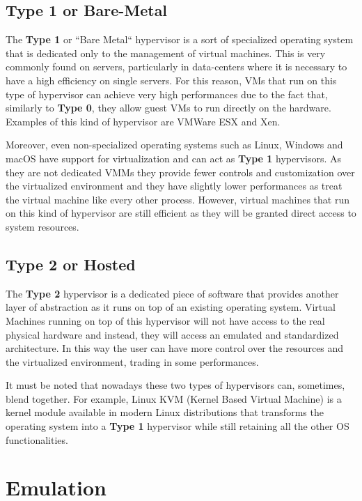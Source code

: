 \subsection{Type 1 or Bare-Metal}

The \textbf{Type 1} or ``Bare Metal`` hypervisor is a sort of specialized operating system that is dedicated only to the management of virtual machines. This is very commonly found on servers, particularly in data-centers where it is necessary to have a high efficiency on single servers. For this reason, VMs that run on this type of hypervisor can achieve very high performances due to the fact that, similarly to \textbf{Type 0}, they allow guest VMs to run directly on the hardware. Examples of this kind of hypervisor are VMWare ESX and Xen.

Moreover, even non-specialized operating systems such as Linux, Windows and macOS have support for virtualization and can act as \textbf{Type 1} hypervisors. As they are not dedicated VMMs they provide fewer controls and customization over the virtualized environment and they have slightly lower performances as treat the virtual machine like every other process. However, virtual machines that run on this kind of hypervisor are still efficient as they will be granted direct access to system resources. 

\subsection{Type 2 or Hosted}

The \textbf{Type 2 }hypervisor is a dedicated piece of software that provides another layer of abstraction as it runs on top of an existing operating system. Virtual Machines running on top of this hypervisor will not have access to the real physical hardware and instead, they will access an emulated and standardized architecture. In this way the user can have more control over the resources and the virtualized environment, trading in some performances. 

It must be noted that nowadays these two types of hypervisors can, sometimes, blend together. For example, Linux KVM (Kernel Based Virtual Machine) is a kernel module available in modern Linux distributions that transforms the operating system into a \textbf{Type 1} hypervisor while still retaining all the other OS functionalities.


\section{Emulation}

